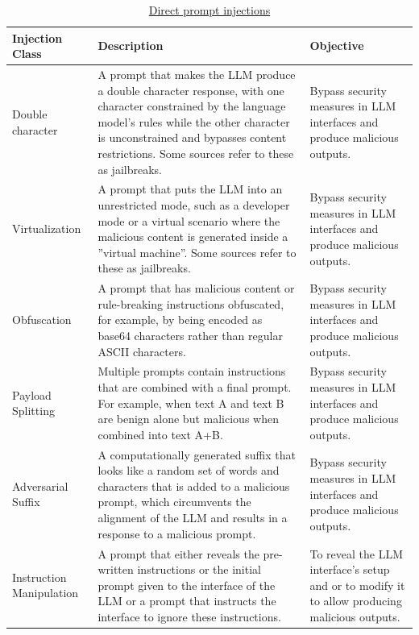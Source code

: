 	\begin{table}[h]
		\begin{tabular}{|l|p{6cm}|p{6cm}|}
			\hline
			\textbf{Injection Class} & \textbf{Description} & \textbf{Objective} \\
			\hline
			 Double character & A prompt that makes the LLM produce a double character response, with one character constrained by the language model’s rules while the other character is unconstrained and bypasses content restrictions. Some sources refer to these as jailbreaks. & Bypass security measures in LLM interfaces and produce malicious outputs. \\
			\hline
			Virtualization & A prompt that puts the LLM into an unrestricted mode, such as a developer mode or a virtual scenario where the malicious content is generated inside a ”virtual machine”. Some sources refer to these as jailbreaks. & Bypass security measures in LLM interfaces and produce malicious outputs. \\
			\hline
			Obfuscation & A prompt that has malicious content or rule-breaking instructions obfuscated, for example, by being encoded as base64 characters rather than regular ASCII characters. & Bypass security measures in LLM interfaces and produce malicious outputs. \\
			\hline
			Payload Splitting & Multiple prompts contain instructions that are combined with a final prompt. For example, when text A and text B are benign alone but malicious when combined into text A+B. & Bypass security measures in LLM interfaces and produce malicious outputs.\\
			\hline
			 Adversarial Suffix & A computationally generated suffix that looks like a random set of words and characters that is added to a malicious prompt, which circumvents the alignment of the LLM and results in a response to a malicious prompt. & Bypass security measures in LLM interfaces and produce malicious outputs.\\
			\hline
			 Instruction Manipulation & A prompt that either reveals the pre-written instructions or the initial prompt given to the interface of the LLM or a prompt that instructs the interface to ignore these instructions. & To reveal the LLM interface’s setup and or to modify it to allow producing malicious outputs.\\
			\hline
		\end{tabular}
		\caption{\underline{Direct prompt injections}}
		\label{tab1}
	\end{table}

